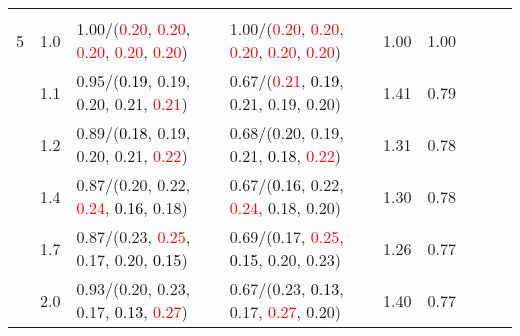 \documentclass[10pt,a4paper]{report}
\begin{document}
\begin{table}[!htbp]
\begin{center}
{\begin{tabular}{ccllccccc}
				  &                                   &                                                                                                                                                 &                                                                                                                                                 &                                             \\
				5 & 1.0                               & 1.00/(\textcolor{red}{0.20}, \textcolor{red}{0.20}, \textcolor{red}{0.20}, \textcolor{red}{0.20}, \textcolor{red}{0.20})                        & 1.00/(\textcolor{red}{0.20}, \textcolor{red}{0.20}, \textcolor{red}{0.20}, \textcolor{red}{0.20}, \textcolor{red}{0.20})                        & 1.00             & 1.00                     \\
				  & 1.1                               & 0.95/(\textcolor{black}{0.19}, 0.19, 0.20, 0.21, \textcolor{red}{0.21})                                                                         & 0.67/(\textcolor{red}{0.21}, \textcolor{black}{0.19}, 0.21, 0.19, 0.20)                                                                         & 1.41             & 0.79                     \\
				  & 1.2                               & 0.89/(\textcolor{black}{0.18}, 0.19, 0.20, 0.21, \textcolor{red}{0.22})                                                                         & 0.68/(0.20, 0.19, 0.21, \textcolor{black}{0.18}, \textcolor{red}{0.22})                                                                         & 1.31             & 0.78                     \\
				  & 1.4                               & 0.87/(0.20, 0.22, \textcolor{red}{0.24}, \textcolor{black}{0.16}, 0.18)                                                                         & 0.67/(\textcolor{black}{0.16}, 0.22, \textcolor{red}{0.24}, 0.18, 0.20)                                                                         & 1.30             & 0.78                     \\
				  & 1.7                               & 0.87/(0.23, \textcolor{red}{0.25}, 0.17, 0.20, \textcolor{black}{0.15})                                                                         & 0.69/(0.17, \textcolor{red}{0.25}, \textcolor{black}{0.15}, 0.20, 0.23)                                                                         & 1.26             & 0.77                     \\
				  & 2.0                               & 0.93/(0.20, 0.23, 0.17, \textcolor{black}{0.13}, \textcolor{red}{0.27})                                                                         & 0.67/(0.23, \textcolor{black}{0.13}, 0.17, \textcolor{red}{0.27}, 0.20)                                                                         & 1.40             & 0.77                     \\

\end{tabular}}
\end{center}
\end{table}
\end{document}
